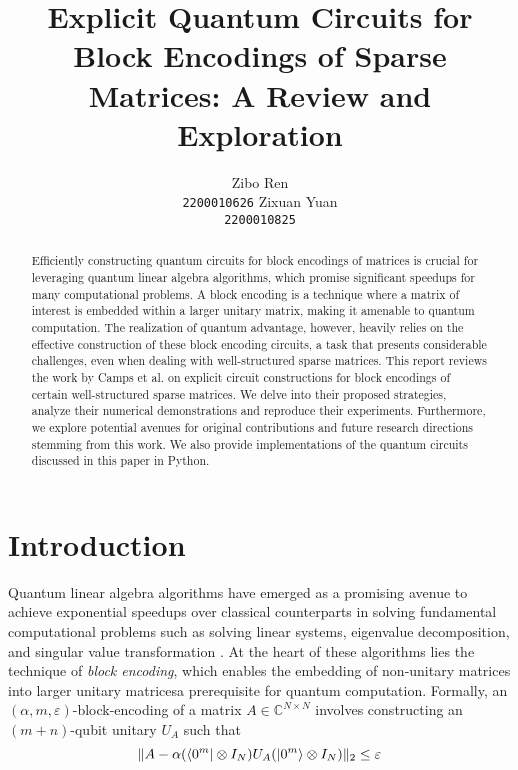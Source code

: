 \documentclass{article}
\title{Explicit Quantum Circuits for Block Encodings of Sparse Matrices: A Review and Exploration}
\author{%
    \large Zibo Ren \\
    \large \texttt{2200010626}
    \And
    \large Zixuan Yuan \\
    \large \texttt{2200010825}
}
\begin{document}
    \large

    \maketitle

    \begin{abstract}

        Efficiently constructing quantum circuits for block encodings of matrices is crucial for leveraging quantum linear algebra algorithms, which promise significant speedups for many computational problems.
        A block encoding is a technique where a matrix of interest is embedded within a larger unitary matrix, making it amenable to quantum computation.
        The realization of quantum advantage, however, heavily relies on the effective construction of these block encoding circuits, a task that presents considerable challenges, even when dealing with well-structured sparse matrices.
        This report reviews the work by Camps et al. \cite{EQC} on explicit circuit constructions for block encodings of certain well-structured sparse matrices.
        We delve into their proposed strategies, analyze their numerical demonstrations and reproduce their experiments.
        Furthermore, we explore potential avenues for original contributions and future research directions stemming from this work.
        We also provide implementations of the quantum circuits discussed in this paper in Python.

    \end{abstract}


    \section{Introduction}

    Quantum linear algebra algorithms have emerged as a promising avenue to achieve exponential speedups over classical counterparts in solving fundamental computational problems such as solving linear systems, eigenvalue decomposition, and singular value transformation \cite{EQC}. At the heart of these algorithms lies the technique of \emph{block encoding}, which enables the embedding of non-unitary matrices into larger unitary matrices\textemdash a prerequisite for quantum computation. Formally, an $(\alpha, m, \varepsilon)$-block-encoding of a matrix $A \in \mathbb{C}^{N \times N}$ involves constructing an $(m+n)$-qubit unitary $U_A$ such that
    $$\|A - \alpha(\bra{0^m} \otimes I_N)U_A(\ket{0^m} \otimes I_N)\|_2 \leq \varepsilon$$
\end{document}

